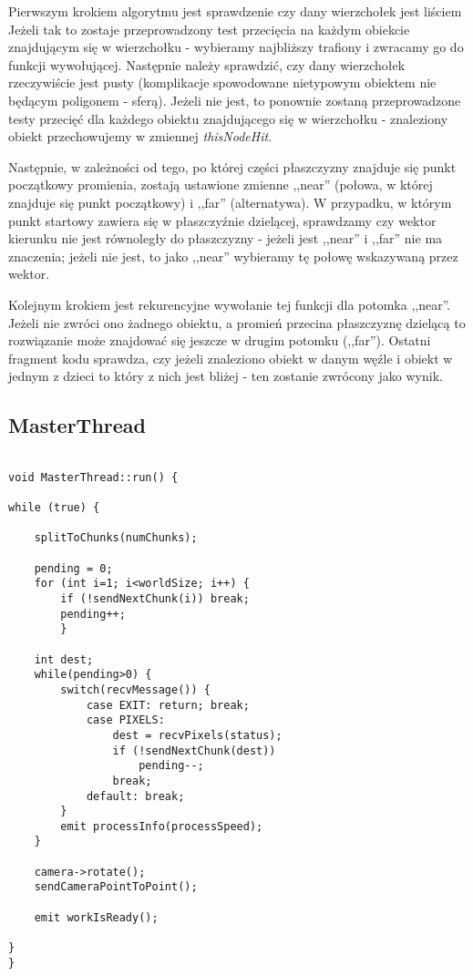 Pierwszym krokiem algorytmu jest sprawdzenie czy dany wierzchołek jest liściem Jeżeli tak to zostaje przeprowadzony test przecięcia na każdym obiekcie znajdującym się w wierzchołku - wybieramy najbliższy trafiony i zwracamy go do funkcji wywołującej. Następnie należy sprawdzić, czy dany wierzchołek rzeczywiście jest pusty (komplikacje spowodowane nietypowym obiektem nie będącym poligonem - sferą). Jeżeli nie jest, to ponownie zostaną przeprowadzone testy przecięć dla każdego obiektu znajdującego się w wierzchołku - znaleziony obiekt przechowujemy w zmiennej \emph{thisNodeHit}.

Następnie, w zależności od tego, po której części płaszczyzny znajduje się punkt początkowy promienia, zostają ustawione zmienne ,,near'' (połowa, w której znajduje się punkt początkowy) i ,,far'' (alternatywa). W przypadku, w którym punkt startowy zawiera się w płaszczyźnie dzielącej, sprawdzamy czy wektor kierunku nie jest równoległy do płaszczyzny - jeżeli jest ,,near'' i ,,far'' nie ma znaczenia; jeżeli nie jest, to jako ,,near'' wybieramy tę połowę wskazywaną przez wektor.

Kolejnym krokiem jest rekurencyjne wywołanie tej funkcji dla potomka ,,near''. Jeżeli nie zwróci ono żadnego obiektu, a promień przecina płaszczyznę dzielącą to rozwiązanie może znajdować się jeszcze w drugim potomku (,,far''). Ostatni fragment kodu sprawdza, czy jeżeli znaleziono obiekt w danym węźle i obiekt w jednym z dzieci to który z nich jest bliżej - ten zostanie zwrócony jako wynik.

\subsection{MasterThread}
	
	
\begin{lstlisting}

void MasterThread::run() {

while (true) {

    splitToChunks(numChunks);

    pending = 0;
    for (int i=1; i<worldSize; i++) {
        if (!sendNextChunk(i)) break;
        pending++;
        }

    int dest;
    while(pending>0) {
        switch(recvMessage()) {
            case EXIT: return; break;
            case PIXELS:
                dest = recvPixels(status);
                if (!sendNextChunk(dest))
                    pending--;
                break;
            default: break;
        }
        emit processInfo(processSpeed);
    }

    camera->rotate();
    sendCameraPointToPoint();

    emit workIsReady();

}
}

\end{lstlisting}


